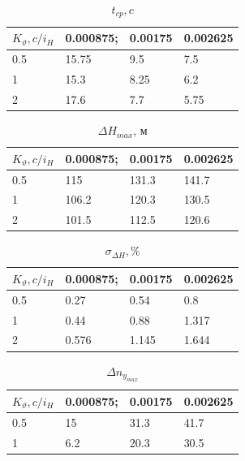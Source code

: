 \documentclass[a4paper,12pt]{article}
\begin{document}
\begin{enumerate}
    \begin{table}[H]
        \centering
        \caption{$t_{cp},c$}
        \begin{tabular}{|l|l|l|l|}
        \hline
            $K_\vartheta,c/i_H$ & 0.000875; & 0.00175 & 0.002625  \\ \hline
            0.5 & 15.75 & 9.5 & 7.5  \\ \hline
            1 & 15.3 & 8.25 & 6.2  \\ \hline
            2 & 17.6 & 7.7 & 5.75  \\ \hline
        \end{tabular}
    \end{table}
    \begin{table}[H]
        \centering
        \caption{$\Delta H_{max}$, м}
        \label{tab:Время срабатывания}
        \begin{tabular}{|l|l|l|l|}
        \hline
            $K_\vartheta,c/i_H$ & 0.000875; & 0.00175 & 0.002625  \\ \hline
            0.5 & 115 & 131.3 & 141.7  \\ \hline
            1 & 106.2 & 120.3 & 130.5  \\ \hline
            2 & 101.5 & 112.5 & 120.6  \\ \hline
        \end{tabular}
    \end{table}
    \begin{table}[H]
        \centering
        \caption{$\sigma_{\Delta H},\%$ }
        \begin{tabular}{|l|l|l|l|}
        \hline
            $K_\vartheta,c/i_H$ & 0.000875; & 0.00175 & 0.002625  \\ \hline
            0.5 & 0.27  & 0.54 & 0.8  \\ \hline
            1 & 0.44 & 0.88 & 1.317  \\ \hline
            2 & 0.576 & 1.145 & 1.644  \\ \hline
        \end{tabular}
    \end{table}
    \begin{table}[H]
        \centering
        \caption{$\Delta n_{y_{max}}$}
        \begin{tabular}{|l|l|l|l|}
        \hline
            $K_\vartheta,c/i_H$ & 0.000875; & 0.00175 & 0.002625  \\ \hline
            0.5 & 15  & 31.3 & 41.7  \\ \hline
            1 & 6.2 & 20.3 & 30.5  \\ \hline

\end{tabular}
\end{table}
\end{enumerate}
\end{document}
